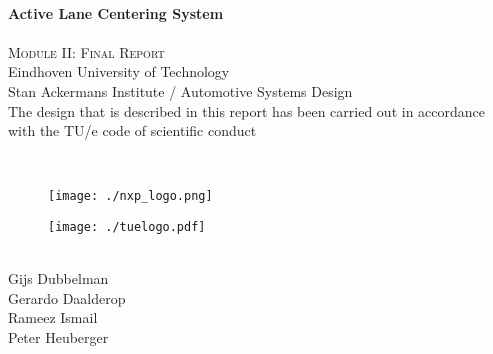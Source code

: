 \documentclass[
11pt, %
english, %
singlespacing, %
]{MastersDoctoralThesis} %
\begin{document}
\begin{center}
\HRule \\[0.5cm] %
{\huge \bfseries Active Lane Centering System}\\[0.4cm] %
\HRule \\[2cm] %

\textsc{\huge Module II: Final Report}\\[0.5cm] %
\vspace*{60pt}
Eindhoven University of Technology\\

Stan Ackermans Institute / Automotive Systems Design\\
\vspace*{30pt}
The design that is described in this report has been carried out in accordance with the TU/e code of scientific conduct
\vspace*{30pt}
\begin{flushleft} \large
{} \\
\end{flushleft}

\begin{figure}[h]
\centering
\begin{minipage}{.5\textwidth}
  \centering
  \texttt{[image: ./nxp\_logo.png]}
  \label{fig:test1}
\end{minipage}%
\begin{minipage}{.5\textwidth}
  \centering
  \texttt{[image: ./tuelogo.pdf]}
  \label{fig:test2}
\end{minipage}
\end{figure}

\vspace*{60pt}

\begin{flushleft} \large
{} \\

Gijs Dubbelman\\
Gerardo Daalderop\\
Rameez Ismail\\
Peter Heuberger\\
\end{flushleft}

\end{center}
%

\end{document}
